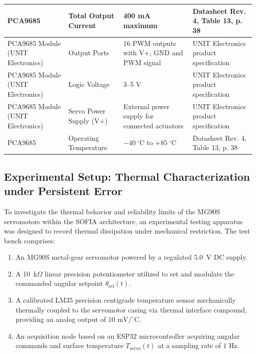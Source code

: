 \documentclass[lettersize,journal]{IEEEtran}
\begin{document}
\begin{table}[ht]
\begin{tabular}{|p{1.4cm}|p{1.8cm}|p{1.8cm}|p{1.8cm}|}
		PCA9685 &
		Total Output Current &
		400 mA maximum &
		Datasheet Rev. 4, Table 13, p. 38 \\
		\hline
		
		PCA9685 Module (UNIT Electronics) &
		Output Ports &
		16 PWM outputs with V+, GND and PWM signal &
		UNIT Electronics product specification \\
		\hline
		
		PCA9685 Module (UNIT Electronics) &
		Logic Voltage &
		3--5 V &
		UNIT Electronics product specification \\
		\hline
		
		PCA9685 Module (UNIT Electronics) &
		Servo Power Supply (V+) &
		External power supply for connected actuators &
		UNIT Electronics product specification \\
		\hline
		
		PCA9685 &
		Operating Temperature &
		$-40~^\circ\mathrm{C}$ to $+85~^\circ\mathrm{C}$ &
		Datasheet Rev. 4, Table 13, p. 38 \\
		\hline
		
	\end{tabular}
\end{table}

\subsection{Experimental Setup: Thermal Characterization under Persistent Error}
\label{sec:thermal_experiment}

To investigate the thermal behavior and reliability limits of the MG90S servomotors within the SOFIA architecture, an experimental testing apparatus was designed to record thermal dissipation under mechanical restriction. The test bench comprises:
\begin{enumerate}
\item An MG90S metal-gear servomotor powered by a regulated 5.0~V DC supply.
\item A 10~k$\Omega$ linear precision potentiometer utilized to set and modulate the commanded angular setpoint $\theta_{\text{ref}}(t)$.
\item A calibrated LM35 precision centigrade temperature sensor mechanically thermally coupled to the servomotor casing via thermal interface compound, providing an analog output of $10\text{ mV}/^\circ\text{C}$.
\item An acquisition node based on an ESP32 microcontroller acquiring angular commands and surface temperature $T_{\text{servo}}(t)$ at a sampling rate of $1\text{ Hz}$.
\end{enumerate}
\end{document}
